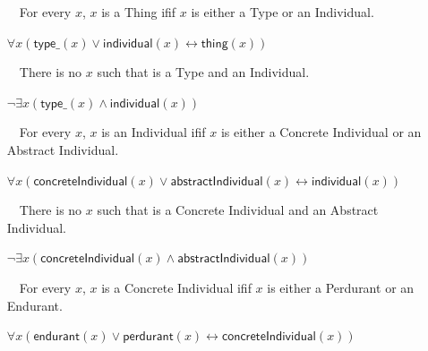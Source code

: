 \documentclass{article}
\newcommand{\AxLabel}{a}
\newcounter{cntax}
\newcommand{\myax}[1]{\refstepcounter{cntax}{\bf \small \AxLabel\thecntax}\label{#1}$\,\,\,\,$}
\newcommand{\me}[1]{\textsf{#1}}
\begin{document}
\begin{itemize}
    \item[\myax{ax_thing_taxonomy}] For every $x$, $x$ is a \me{Thing} ifif $x$ is either a \me{Type} or an \me{Individual}.
    
    $\forall x(\textsf{type\_}(x)\vee \textsf{individual}(x)\leftrightarrow \textsf{thing}(x))$
    
    
    
    
    \item[\myax{ax_thing_partition}] There is no $x$ such that is a \me{Type} and an \me{Individual}.
    
    $\neg \exists x(\textsf{type\_}(x)\wedge \textsf{individual}(x))$
    
    


    \item[\myax{ax_individual_taxonomy}] For every $x$, $x$ is an \me{Individual} ifif $x$ is either a \me{Concrete Individual} or an \me{Abstract Individual}.
    
    $\forall x(\textsf{concreteIndividual}(x)\vee \textsf{abstractIndividual}(x)\leftrightarrow \textsf{individual}(x))$

    


    \item[\myax{ax_individual_partition}] There is no $x$ such that is a \me{Concrete Individual} and an \me{Abstract Individual}.
    
    $\neg \exists x(\textsf{concreteIndividual}(x)\wedge \textsf{abstractIndividual}(x))$

    

    
    \item[\myax{ax_concreteIndividual_taxonomy}] For every $x$, $x$ is a \me{Concrete Individual} ifif $x$ is either a \me{Perdurant} or an \me{Endurant}.
    
    $\forall x(\textsf{endurant}(x)\vee \textsf{perdurant}(x)\leftrightarrow \textsf{concreteIndividual}(x))$

    



\end{itemize}
\end{document}
